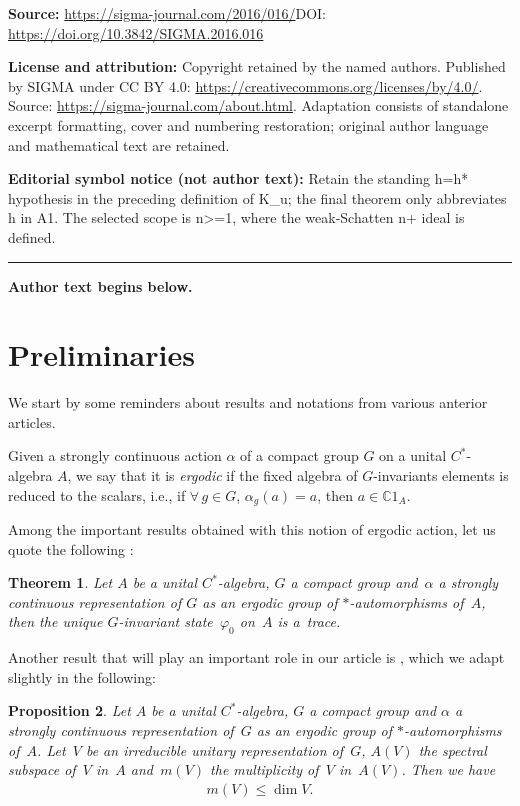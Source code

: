 \documentclass[11pt]{article}
\newtheorem{Theorem}{Theorem}[section]
\newtheorem{Proposition}[Theorem]{Proposition}
 { \theoremstyle{definition}
\newtheorem{Definition}[Theorem]{Definition}
\newtheorem{Note}[Theorem]{Note}
\newtheorem{Example}[Theorem]{Example}
\newtheorem{Remark}[Theorem]{Remark} }
\newcommand{\C}{\mathbb{C}}
\numberwithin{equation}{section}
\begin{document}
\noindent\textbf{Source:} \url{https://sigma-journal.com/2016/016/}\quad DOI: \url{https://doi.org/10.3842/SIGMA.2016.016}\par
\noindent\textbf{License and attribution:} Copyright retained by the named authors. Published by SIGMA under CC BY 4.0: \url{https://creativecommons.org/licenses/by/4.0/}. Source: \url{https://sigma-journal.com/about.html}. Adaptation consists of standalone excerpt formatting, cover and numbering restoration; original author language and mathematical text are retained.\par
\noindent\textbf{Editorial symbol notice (not author text):} Retain the standing h=\allowbreak{}h*\allowbreak{} hypothesis in the preceding definition of K\_u; the final theorem only abbreviates h in A1. The selected scope is n>=\allowbreak{}1, where the weak-Schatten n+\allowbreak{} ideal is defined.\par
\medskip\hrule\medskip\noindent\textbf{Author text begins below.}\par
\setcounter{section}{1}
\setcounter{subsection}{0}
\setcounter{subsubsection}{0}
\setcounter{Theorem}{0}
\setcounter{equation}{0}
\section{Preliminaries}
\label{Sec:Reminders}

We start by some reminders about results and notations from various anterior articles.
\begin{Definition}
Given a strongly continuous action $\alpha$ of a compact group $G$ on a unital $C^*$-algebra $A$, we say that it is \emph{ergodic} if the f\/ixed algebra of $G$-invariants elements is reduced to the scalars, i.e., if $\forall \, g \in G$, $\alpha_g(a) = a$, then $a \in \C 1_A$.
\end{Definition}

Among the important results obtained with this notion of ergodic action, let us quote the following \cite[Theorem~4.1, p.~82]{ErgodCpctGpHKLS}:
\begin{Theorem}
\label{Thm:ErgodAct}
Let $A$ be a unital $C^*$-algebra, $G$ a compact group and~$\alpha$ a strongly continuous representation of $G$ as an ergodic group of $*$-automorphisms of~$A$, then the unique $G$-invariant state~$\varphi_0$ on~$A$ is a~trace.
\end{Theorem}

Another result that will play an important role in our article is %
\cite[Proposition~2.1, p.~76]{ErgodCpctGpHKLS}, which we adapt slightly in the following:
\begin{Proposition}
\label{Prop:multiplicity}
Let $A$ be a unital $C^*$-algebra, $G$ a compact group and $\alpha$ a strongly continuous representation of~$G$ as an ergodic group of $*$-automorphisms of~$A$. Let~$V$ be an irreducible unitary representation of~$G$, $A(V)$ the spectral subspace of~$V$ in~$A$ and~$m(V)$ the multiplicity of~$V$ in~$A(V)$. Then we have
\begin{gather*}
m(V) \leqslant \dim V.
\end{gather*}
\end{Proposition}
\end{document}
